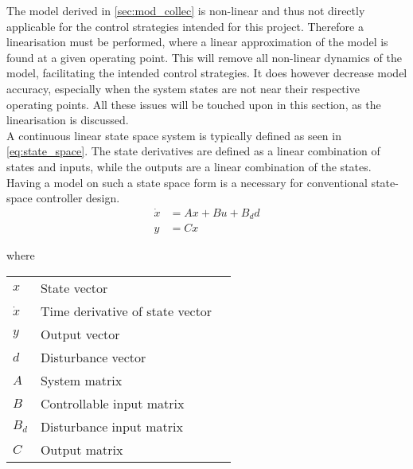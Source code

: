 







The model derived in \cref{sec:mod_collec} is non-linear and thus not directly applicable for the control strategies intended for this project. Therefore a linearisation must be performed, where a linear approximation of the model is found at a given operating point. This will remove all non-linear dynamics of the model, facilitating the intended control strategies. It does however decrease model accuracy, especially when the system states are not near their respective operating points. All these issues will be touched upon in this section, as the linearisation is discussed.\\

A continuous linear state space system is typically defined as seen in \cref{eq:state_space}. The state derivatives are defined as a linear combination of states and inputs, while the outputs are a linear combination of the states. Having a model on such a state space form is a necessary for conventional state-space controller design.\\

\begin{equation} \label{eq:state_space}
	\begin{split}
		\dot{x} & = Ax + Bu + B_dd \\
		y 		& = Cx
	\end{split}
\end{equation}

where

\begin{center}
	\begin{tabular}{l p{8cm} l}
		$x$       & State vector                    &  \\
		$\dot{x}$ & Time derivative of state vector &  \\
		$y$       & Output vector                   &  \\
		$d$       & Disturbance vector              &  \\
		$A$       & System matrix                   &  \\
		$B$       & Controllable input matrix       &  \\
		$B_d$     & Disturbance input matrix        &  \\
		$C$       & Output matrix                   &
	\end{tabular}
\end{center}


